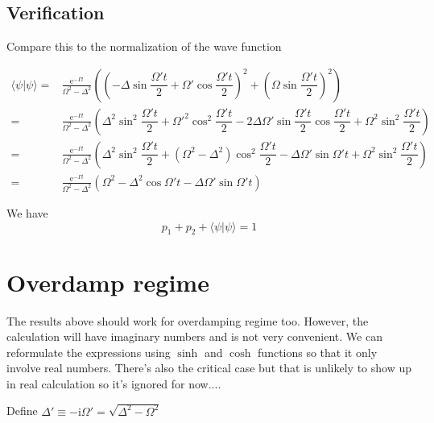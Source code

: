 \documentclass[10pt,fleqn]{article}
\newcommand{\ue}{\mathrm{e}}
\newcommand{\ui}{\mathrm{i}}
\newcommand{\eqar}[1]
{
  \begin{align*}
    #1
  \end{align*}
}
\newcommand{\paren}[1]{{\left({#1}\right)}}
\begin{document}
\subsection{Verification}
Compare this to the normalization of the wave function
\eqar{
  \langle\psi|\psi\rangle=&\frac{\ue^{-\Gamma t}}{\Omega^2-\Delta^2}\paren{
    \paren{-\Delta\sin\dfrac{\Omega't}{2}+\Omega'\cos\dfrac{\Omega't}{2}}^2+
    \paren{\Omega\sin\dfrac{\Omega't}{2}}^2
  }\\
  =&\frac{\ue^{-\Gamma t}}{\Omega^2-\Delta^2}\paren{
    \Delta^2\sin^2\dfrac{\Omega't}{2}+\Omega'^2\cos^2\dfrac{\Omega't}{2}
    -2\Delta\Omega'\sin\dfrac{\Omega't}{2}\cos\dfrac{\Omega't}{2}+
    \Omega^2\sin^2\dfrac{\Omega't}{2}
  }\\
  =&\frac{\ue^{-\Gamma t}}{\Omega^2-\Delta^2}\paren{
    \Delta^2\sin^2\dfrac{\Omega't}{2}+\paren{\Omega^2-\Delta^2}\cos^2\dfrac{\Omega't}{2}
    -\Delta\Omega'\sin\Omega't+
    \Omega^2\sin^2\dfrac{\Omega't}{2}
  }\\
  =&\frac{\ue^{-\Gamma t}}{\Omega^2-\Delta^2}\paren{
    \Omega^2-\Delta^2\cos\Omega't-\Delta\Omega'\sin\Omega't
  }
}
We have
\[p_1 + p_2+\langle\psi|\psi\rangle=1\]

\section{Overdamp regime}
The results above should work for overdamping regime too.
However, the calculation will have imaginary numbers and is not very convenient.
We can reformulate the expressions using $\sinh$ and $\cosh$ functions so that it only involve
real numbers. There's also the critical case but that is unlikely to show up in real calculation
so it's ignored for now....

Define $\Delta'\equiv-\ui\Omega'=\sqrt{\Delta^2-\Omega^2}$
\end{document}
